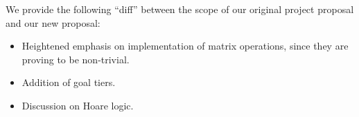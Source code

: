 \documentclass[11pt,conference]{IEEEtran}
\theoremstyle{plain} %
\theoremstyle{definition}
\theoremstyle{remark}
\begin{document}
We provide the following ``diff'' between the scope of our original project
proposal and our new proposal:
\begin{itemize}
    \item Heightened emphasis on implementation of matrix operations, since they
        are proving to be non-trivial.
    \item Addition of goal tiers.
    \item Discussion on Hoare logic.
\end{itemize}

{\printbibliography}
\end{document}
